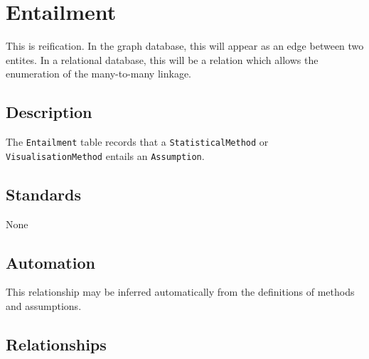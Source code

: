 \documentclass[
]{article}
\begin{document}
\section{Entailment}\label{entailment}

This is reification. In the graph database, this will appear as an edge
between two entites. In a relational database, this will be a relation
which allows the enumeration of the many-to-many linkage.

\subsection{Description}\label{description-13}

The \texttt{Entailment} table records that a \texttt{StatisticalMethod}
or \texttt{VisualisationMethod} entails an \texttt{Assumption}.

\subsection{Standards}\label{standards-15}

None

\subsection{Automation}\label{automation-15}

This relationship may be inferred automatically from the definitions of
methods and assumptions.

\subsection{Relationships}\label{relationships-11}
\end{document}
